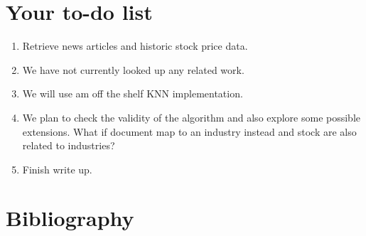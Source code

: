 \documentclass[11pt,letterpaper]{article}
\newcommand{\blue}[1]{\textcolor{RoyalBlue}{#1}}
\newcommand{\instructions}[1]{\blue{\textit{#1}}}
\renewcommand{\instructions}[1]{}
\begin{document}
\section*{Your to-do list}
\instructions{Get started by making a to-do list. If you have a group
  project: who will do what? Set yourself deadlines. Here are a few
  items that might appear on your to-do list}
\begin{enumerate}
\item Retrieve news articles and historic stock price data.
\item We have not currently looked up any related work.
\item We will use am off the shelf KNN implementation.
\item We plan to check the validity of the algorithm and also explore some possible
  extensions. What if document map to an industry instead and stock are also related
  to industries?
\item Finish write up.
\end{enumerate}

\section*{Bibliography}
\instructions{If you need references for the background section, don't forget to create your own .bib file, and run {\tt bibtex}. If you call your bibliography {\tt mybib.bib} and put it in the same directory as this {\tt .tex} file, add {\tt$\backslash$bibliography\{mybib\}} before {\tt$\backslash$end\{document\}}
}
  
\end{document}
